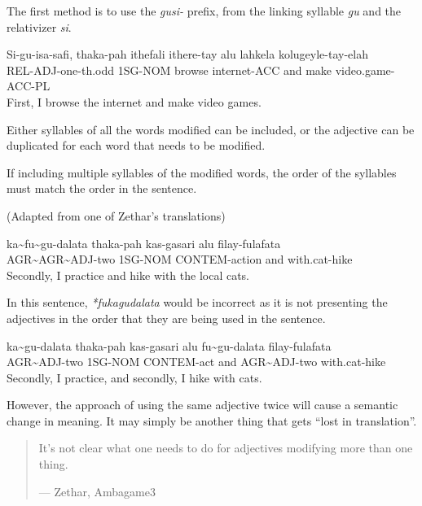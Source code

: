 The first method is to use the \textit{gusi-} prefix, from the linking syllable \textit{gu} and the relativizer \textit{si}.

\begin{exe}
    \ex{} \gll{}Si-gu-isa-safi,    thaka-pah ithefali ithere-tay alu lahkela kolugeyle-tay-elah   \\
                REL-ADJ-one-th.odd 1SG-NOM   browse   internet-ACC and make    video.game-ACC-PL  \\
          \glt{}First, I browse the internet and make video games.
\end{exe}

Either syllables of all the words modified can be included, or the adjective can be duplicated for each word that needs to be modified.

If including multiple syllables of the modified words, the order of the syllables must match the order in the sentence.

(Adapted from one of Zethar's translations)
\begin{exe}
\ex{} \gll{}ka\~{}fu\~{}gu-dalata       thaka-pah kas-gasari     alu filay-fulafata\\
            AGR\~{}AGR\~{}ADJ-two 1SG-NOM   CONTEM-action  and with.cat-hike\\
      \glt{}Secondly, I practice and hike with the local cats.
\end{exe}

In this sentence, \textit{*fukagudalata} would be incorrect as it is not presenting the adjectives in the order that they are being used in the sentence.

\begin{exe}
\ex{} \gll{}ka\~{}gu-dalata thaka-pah kas-gasari alu fu\~{}gu-dalata filay-fulafata\\
            AGR\~{}ADJ-two  1SG-NOM   CONTEM-act and AGR\~{}ADJ-two  with.cat-hike\\
      \glt{}Secondly, I practice, and secondly, I hike with cats.
\end{exe}

However, the approach of using the same adjective twice will cause a semantic change in meaning.
It may simply be another thing that gets ``lost in translation''.

\begin{quote}
    It’s not clear what one needs to do for adjectives modifying more than one thing.

    --- Zethar, Ambagame3
\end{quote}